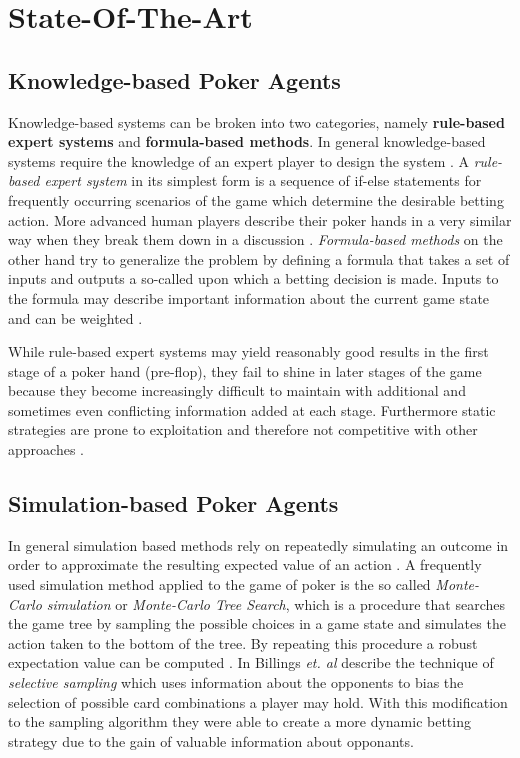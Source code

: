 

\chapter{State-Of-The-Art}
\label{cha:State-Of-The-Art}
\section{Knowledge-based Poker Agents}
Knowledge-based systems can be broken into two categories, namely \textbf{rule-based expert systems} and \textbf{formula-based methods}. In general knowledge-based systems require the knowledge of an expert player to design the system \cite{review}. A \textit{rule-based expert system} in its simplest form is a sequence of if-else statements for frequently occurring scenarios of the game which determine the desirable betting action. More advanced human players describe their poker hands in a very similar way when they break them down in a discussion \cite{master_nuno}. \textit{Formula-based methods} on the other hand try to generalize the problem by defining a formula that takes a set of inputs and outputs a so-called  upon which a betting decision is made. Inputs to the formula may describe important information about the current game state and can be weighted \cite{review}. \par
While rule-based expert systems may yield reasonably good results in the first stage of a poker hand (pre-flop), they fail to shine in later stages of the game because they become increasingly difficult to maintain with additional and sometimes even conflicting information added at each stage. Furthermore  static strategies are prone to exploitation and therefore not competitive with other approaches \cite{review}.
\section{Simulation-based Poker Agents}
In general simulation based methods rely on repeatedly simulating an outcome in order to approximate the resulting expected value of an action \cite{master_nuno}. A frequently used simulation method applied to the game of poker is the so called \textit{Monte-Carlo simulation} or \textit{Monte-Carlo Tree Search}, which is a procedure that searches the game tree by sampling the possible choices in a game state and simulates the action taken to the bottom of the tree. By repeating this procedure a robust expectation value can be computed \cite{review}. 
In \cite{selective_sampling} Billings \textit{et. al} describe the technique of \textit{selective sampling} which uses information about the opponents to bias the selection of possible card combinations a player may hold. With this modification to the sampling algorithm they were able to create a more dynamic betting strategy due to the gain of valuable information about opponants. 
